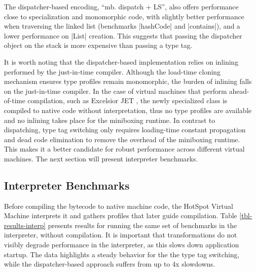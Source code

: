 The dispatcher-based encoding, ``mb. dispatch + LS'', also offers performance close to specialization and mono\-morphic code, with slightly better performance when traversing the linked list (benchmarks |hashCode| and |contains|), and a lower performance on |List| creation. This suggests that passing the dispatcher object on the stack is more expensive than passing a type tag. 

It is worth noting that the dispatcher-based implementation relies on inlining performed by the just-in-time compiler. Although the load-time cloning mechanism ensures type profiles remain monomorphic, the burden of inlining falls on the just-in-time compiler. In the case of virtual machines that perform ahead-of-time compilation, such as Excelsior JET \cite{excelsior-jet}, the newly specialized class is compiled to native code without interpretation, thus no type profiles are available and no inlining takes place for the miniboxing runtime. In contrast to dispatching, type tag switching only requires loading-time constant propagation and dead code elimination to remove the overhead of the miniboxing runtime. This makes it a better candidate for robust performance across different virtual machines. The next section will present interpreter benchmarks.

\subsection{Interpreter Benchmarks}
\label{subsec-eval-interpreter}

Before compiling the bytecode to native machine code, the HotSpot Virtual Machine interprets it and gathers profiles that later guide compilation. Table \ref{tbl-results-interp} presents results for running the same set of benchmarks in the interpreter, without compilation. It is important that transformations do not visibly degrade performance in the interpreter, as this slows down application startup. The data highlights a steady behavior for the the type tag switching, while the dispatcher-based approach suffers from up to 4x slowdowns.

